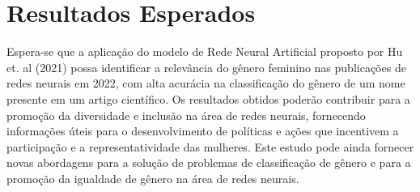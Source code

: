 \documentclass[conference,compsoc]{IEEEtran}
\begin{document}




\section{Resultados Esperados}
Espera-se que a aplicação do modelo de Rede Neural Artificial proposto por Hu et. al (2021) possa identificar a relevância do gênero feminino nas publicações de redes neurais em 2022, com alta acurácia na classificação do gênero de um nome presente em um artigo científico. Os resultados obtidos poderão contribuir para a promoção da diversidade e inclusão na área de redes neurais, fornecendo informações úteis para o desenvolvimento de políticas e ações que incentivem a participação e a representatividade das mulheres. Este estudo pode ainda fornecer novas abordagens para a solução de problemas de classificação de gênero e para a promoção da igualdade de gênero na área de redes neurais.










\end{document}
